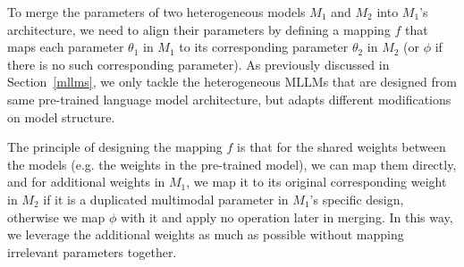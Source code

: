 To merge the parameters of two heterogeneous models $M_1$ and $M_2$ into $M_1$'s architecture, we need to align their parameters by defining a mapping $f$ that maps each parameter $\theta_1$ in $M_1$ to its corresponding parameter $\theta_2$ in $M_2$ (or $\phi$ if there is no such corresponding parameter).
As previously discussed in Section~\ref{mllms}, we only tackle the heterogeneous MLLMs that are designed from same pre-trained language model architecture, but adapts different modifications on model structure.

The principle of designing the mapping $f$ is that for the shared weights between the models (e.g. the weights in the pre-trained model), we can map them directly, and for additional weights in $M_1$, we map it to its original corresponding weight in $M_2$ if it is a duplicated multimodal parameter in $M_1$'s specific design, otherwise we map $\phi$ with it and apply no operation later in merging. In this way, we leverage the additional weights as much as possible without mapping irrelevant parameters together.




